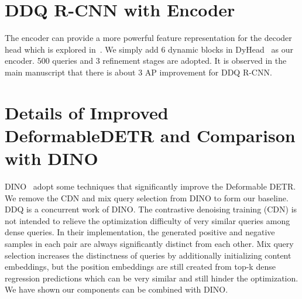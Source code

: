 \documentclass[10pt,twocolumn,letterpaper]{article}
\begin{document}
\section{DDQ R-CNN with Encoder}
\label{sec:heavy}
The encoder can provide a more powerful feature representation for the decoder head which is explored in~\cite{zhu2020deformable,dai2021dynamicdetr, Wang_2020_CVPR}. We simply add 6 dynamic blocks in DyHead~\cite{dai2021dynamichead} as our encoder. 500 queries and 3 refinement stages are adopted. It is observed in the main manuscript that there is about 3 AP improvement for DDQ R-CNN.

\section{Details of Improved DeformableDETR and Comparison with DINO}
\label{sec:imporovedeform}
DINO~\cite{zhang2022dino} adopt some techniques that significantly improve the Deformable DETR. We remove the CDN and mix query selection from DINO to form our baseline. DDQ is a concurrent work of DINO. The contrastive denoising training (CDN) is not
intended to relieve the optimization difficulty of very similar
queries among dense queries. In their implementation, the
generated positive and negative samples in each pair are
always significantly distinct from each other. Mix query
selection increases the distinctness of queries by additionally initializing content embeddings, but the position embeddings are still created from top-k dense regression predictions which can be very similar and still hinder the
optimization. We have shown our components can be combined with DINO.
\end{document}

